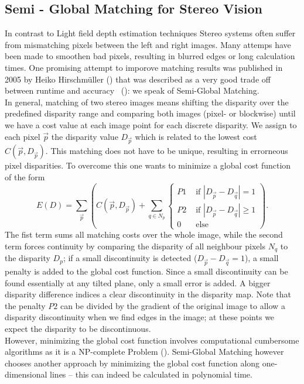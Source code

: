 \documentclass  [
  paper    = a4,
  BCOR     = 10mm,
  twoside,
  fontsize = 12pt,
  fleqn,
  toc      = bibnumbered,
  toc      = listofnumbered,
  numbers  = noendperiod,
  headings = normal,
  listof   = leveldown,
  version  = 3.03
]                                       {scrreprt}
\begin{document}
\subsection{Semi - Global Matching for Stereo Vision}
In contrast to Light field depth estimation techniques Stereo systems often suffer from mismatching pixels between the left and right images. Many attemps have been made to smoothen bad pixels, resulting in blurred edges or long calculation times. One promising attempt to imporove matching results was published in 2005 by Heiko Hirschmüller (\cite{hirschmuller2005accurate}) that was described as \glqq a very good trade off between runtime and accuracy \grqq $\,$ (\cite{hirschmuller2011semi}): we speak of Semi-Global Matching.\\
In general,  matching of two stereo images means shifting the disparity over the predefined disparity range and comparing both images (pixel- or blockwise) until we have a cost value at each image point for each discrete disparity. We assign to each pixel $\vec{p}$ the disparity value $D_{\vec p}$ which is related to the lowest cost $C(\vec{p}, D_{\vec p})$. This matching does not have to be unique, resulting in errorneous pixel disparities. 
To overcome this one wants to minimize a global cost function of the form 
\begin{equation}\label{eq:global_sgm}
E(D) = \sum_{\vec p} \left(C(\vec{p}, D_{\vec p}) + \sum_{q\in N_p} 
\begin{cases}
	P1 & \text{ if }|D_{\vec p} - D_{\vec q}| = 1\\
	P2 & \text{ if }|D_{\vec p} - D_{\vec q}| \geq 1\\
	0 & \text{ else }
	\end{cases}  
\right).
\end{equation}
The fist term sums all matching costs over the whole image, while the second term forces continuity by comparing the disparity of all neighbour pixels $N_q$ to the disparity $D_p$; if a  small discontinuity is detected ($D_{\vec p} - D_{\vec q} = 1$), a small penalty is added to the global cost function. Since a small discontinuity can be found essentially at any tilted plane, only a small error is added. A bigger disparity difference indices a clear discontinuity in the disparity map. Note that the penalty $P2$ can be divided by the gradient of the original image to allow a disparity discontinuity when we find edges in the image; at these points we expect the disparity to be discontinuous.\\ However, minimizing the global cost function involves computational cumbersome algorithms as it is a NP-complete Problem (\cite{hirschmuller2011semi}). Semi-Global Matching however chooses another approach by minimizing the global cost function along one-dimensional lines -- this can indeed be calculated in polynomial time.
\end{document}
